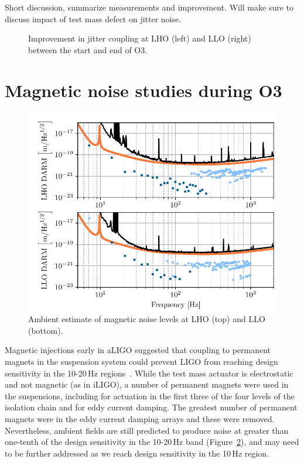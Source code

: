 {\color{red}
Short discussion, summarize measurements and improvement.
Will make sure to discuss impact of test mass defect on jitter noise.}

\begin{figure}
	\centering
	\caption{Improvement in jitter coupling at LHO (left) and LLO (right) between the start and end of O3.}
	\label{fig:jitter}
\end{figure}

\section{Magnetic noise studies during O3}\label{sec:noise-mag}

\begin{figure}[h]
	\centering
	\includegraphics[width=\textwidth]{figures/noise-ambient-mag.pdf}
	\caption{
		Ambient estimate of magnetic noise levels at LHO (top) and LLO (bottom).}
	\label{fig:noise_ambient_mag}
\end{figure}

Magnetic injections early in \ac{aLIGO} suggested that coupling to permanent magnets in the suspension system  could prevent \ac{LIGO} from reaching design sensitivity in the 10-20\,Hz regions~\citep{Schofield_2013}.
While the test mass actuator is electrostatic and not magnetic (as in \ac{iLIGO}), a number of permanent magnets were used in the suspensions, including for actuation in the first three of the four levels of the isolation chain and for eddy current damping.
The greatest number of permanent magnets were in the eddy current damping arrays and these were removed.
Nevertheless, ambient fields are still predicted to produce noise at greater than one-tenth of the design sensitivity in the 10-20\,Hz band (Figure~\ref{fig:noise_ambient_mag}), and may need to be further addressed as we reach design sensitivity in the 10\,Hz region.

